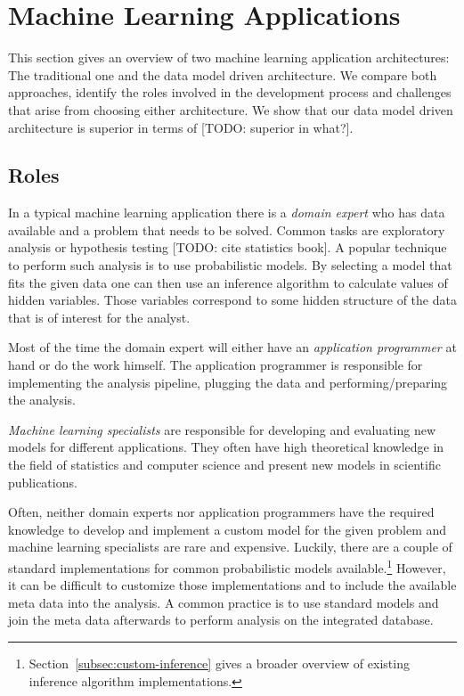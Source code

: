 \section{Machine Learning Applications}

This section gives an overview of two machine learning application architectures: The traditional one and the data model driven architecture. We compare both approaches, identify the roles involved in the development process and challenges that arise from choosing either architecture. We show that our data model driven architecture is superior in terms of [TODO: superior in what?].

\subsection{Roles}

In a typical machine learning application there is a \emph{domain expert} who has data available and a problem that needs to be solved. Common tasks are exploratory analysis or hypothesis testing [TODO: cite statistics book]. A popular technique to perform such analysis is to use probabilistic models. By selecting a model that fits the given data one can then use an inference algorithm to calculate values of hidden variables. Those variables correspond to some hidden structure of the data that is of interest for the analyst.

Most of the time the domain expert will either have an \emph{application programmer} at hand or do the work himself. The application programmer is responsible for implementing the analysis pipeline, plugging the data and performing/preparing the analysis.

\emph{Machine learning specialists} are responsible for developing and evaluating new models for different applications. They often have high theoretical knowledge in the field of statistics and computer science and present new models in scientific publications.

Often, neither domain experts nor application programmers have the required knowledge to develop and implement a custom model for the given problem and machine learning specialists are rare and expensive. Luckily, there are a couple of standard implementations for common probabilistic models available.\footnote{Section~\ref{subsec:custom-inference} gives a broader overview of existing inference algorithm implementations.} However, it can be difficult to customize those implementations and to include the available meta data into the analysis. A common practice is to use standard models and join the meta data afterwards to perform analysis on the integrated database.

